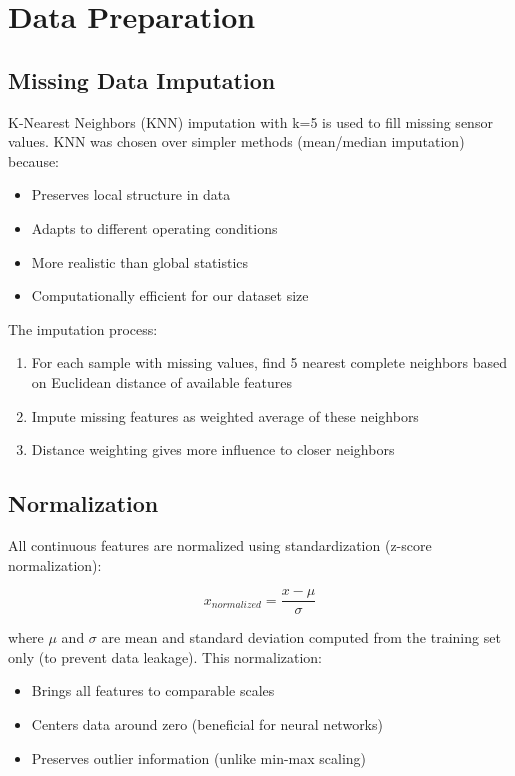 \documentclass[12pt,a4paper]{report}
\begin{document}
\section{Data Preparation}

\subsection{Missing Data Imputation}

K-Nearest Neighbors (KNN) imputation with k=5 is used to fill missing sensor values. KNN was chosen over simpler methods (mean/median imputation) because:

\begin{itemize}
    \item Preserves local structure in data
    \item Adapts to different operating conditions
    \item More realistic than global statistics
    \item Computationally efficient for our dataset size
\end{itemize}

The imputation process:
\begin{enumerate}
    \item For each sample with missing values, find 5 nearest complete neighbors based on Euclidean distance of available features
    \item Impute missing features as weighted average of these neighbors
    \item Distance weighting gives more influence to closer neighbors
\end{enumerate}

\subsection{Normalization}

All continuous features are normalized using standardization (z-score normalization):

\begin{equation}
    x_{normalized} = \frac{x - \mu}{\sigma}
\end{equation}

where $\mu$ and $\sigma$ are mean and standard deviation computed from the training set only (to prevent data leakage). This normalization:
\begin{itemize}
    \item Brings all features to comparable scales
    \item Centers data around zero (beneficial for neural networks)
    \item Preserves outlier information (unlike min-max scaling)
\end{itemize}
\end{document}
